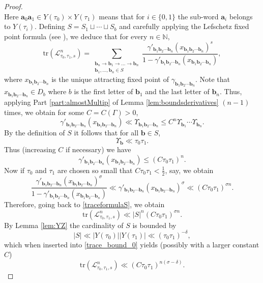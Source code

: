 \documentclass[12pt,letterpaper]{amsart}
\theoremstyle{plain}
\theoremstyle{definition}
\theoremstyle{remark}
\newcommand{\Aa}{\textbf{a}}
\newcommand{\Bb}{\textbf{b}}
\newcommand{\N}{\mathbb{N}}
\begin{document}
\begin{proof}
$$$$
Here $\Aa_0\Aa_1 \in Y(\tau_0) \times Y(\tau_1)$ means that for $i\in \{0,1\}$ the sub-word $\Aa_i$ belongs to $Y(\tau_i)$. Defining $S = S_1 \sqcup \cdots \sqcup S_b $ and carefully applying the Lefschetz fixed point formula (see \cite[Lemma 15.9]{Borthwick_book}), we deduce that for every $n\in \N$,
\begin{equation}\label{traceformulaS}
\mathrm{tr}(\mathcal{L}_{\tau_0, \tau_1, s}^{n}) = \sum_{
\substack{
\Bb_n \to \Bb_1 \to \dots \to \Bb_n \\
\Bb_1, \dots, \Bb_n \in S
}}   \frac{\gamma'_{ \Bb_1 \Bb_2 \cdots \Bb_n} ( x_{\Bb_1 \Bb_2 \cdots \Bb_n} )^s }{1 - \gamma'_{\Bb_1 \Bb_2 \cdots \Bb_n} ( x_{\Bb_1 \Bb_2 \cdots \Bb_n} ) },
\end{equation}
where $x_{\Bb_1 \Bb_2 \cdots \Bb_n}$ is the unique attracting fixed point of $\gamma_{\Bb_1 \Bb_2 \cdots \Bb_n}$. Note that $x_{\Bb_1 \Bb_2 \cdots \Bb_n} \in D_b$ where $b$ is the first letter of $\Bb_1$ and the last letter of $\Bb_n$. Thus, applying Part \eqref{part:almostMultip} of Lemma \ref{lem:boundsderivatives} $(n-1)$ times, we obtain for some $C=C(\Gamma)>0$,
$$
\gamma'_{ \Bb_1 \Bb_2 \cdots \Bb_n} ( x_{\Bb_1 \Bb_2 \cdots \Bb_n} ) \ll \Upsilon_{\Bb_1 \Bb_2 \cdots \Bb_n} \le  C^{n} \Upsilon_{\Bb_1} \cdots \Upsilon_{\Bb_n}.
$$
By the definition of $S$ it follows that for all $\Bb\in S$,
$$
\Upsilon_{\Bb} \ll \tau_0 \tau_1.
$$
Thus (increasing $C$ if necessary) we have
$$
\gamma'_{ \Bb_1 \Bb_2 \cdots \Bb_n} ( x_{\Bb_1 \Bb_2 \cdots \Bb_n} ) \le  (C\tau_0 \tau_1 )^n.
$$
Now if $\tau_0$ and $\tau_1$ are chosen so small that $C\tau_0 \tau_1 < \frac{1}{2}$, say, we obtain
$$
\frac{\gamma'_{ \Bb_1 \Bb_2 \cdots \Bb_n} ( x_{\Bb_1 \Bb_2 \cdots \Bb_n} )^\sigma }{1 - \gamma'_{\Bb_1 \Bb_2 \cdots \Bb_n} ( x_{\Bb_1 \Bb_2 \cdots \Bb_n} ) } \ll \gamma'_{ \Bb_1 \Bb_2 \cdots \Bb_n} ( x_{\Bb_1 \Bb_2 \cdots \Bb_n} )^\sigma \ll (C\tau_0 \tau_1 )^{\sigma n}.
$$
Therefore, going back to \eqref{traceformulaS}, we obtain
\begin{equation}\label{trace_bound_0}
\mathrm{tr}(\mathcal{L}_{\tau_0, \tau_1, s}^{n}) \ll \vert S\vert^n (C \tau_0 \tau_1)^{\sigma n}.
\end{equation}
By Lemma \ref{lem:YZ} the cardinality of $S$ is bounded by
\begin{equation}
\vert S\vert \ll \vert Y(\tau_0)\vert \vert Y(\tau_1)\vert \ll ( \tau_0 \tau_1 )^{-\delta},
\end{equation}
which when inserted into \eqref{trace_bound_0} yields (possibly with a larger constant $C$)
$$
\mathrm{tr}(\mathcal{L}_{\tau_0, \tau_1, s}^{n}) \ll (C \tau_0 \tau_1)^{n(\sigma-\delta) }.
$$
\end{proof}
\end{document}
